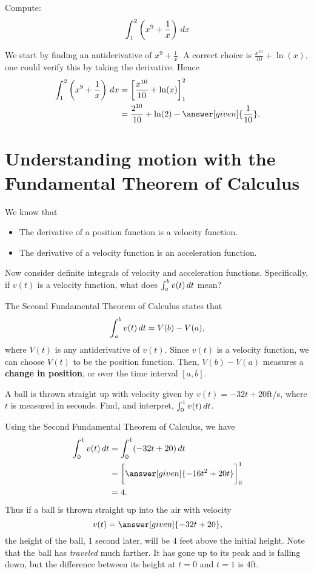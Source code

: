 \documentclass{ximera}
\begin{document}
\begin{example}
Compute:
\[
\int_1^2\left(x^9 + \frac{1}{x}\right) \,d x
\]
\begin{explanation}
We start by finding an antiderivative of $x^9 + \frac{1}{x}$.  A
correct choice is $\frac{x^{10}}{10} + \ln(x)$, one could verify this
by taking the derivative. Hence
\begin{align*}
\int_1^2\left(x^9 + \frac{1}{x}\right) \d x &= \eval{\frac{x^{10}}{10} + \ln(x)}_1^2 \\
&= \frac{2^{10}}{10} + \ln(2) - \answer[given]{\frac{1}{10}}.
\end{align*}
\end{explanation}
\end{example}




\section{Understanding motion with the Fundamental Theorem of Calculus}

We know that
\begin{itemize}
\item The derivative of a position function is a velocity function.
\item The derivative of a velocity function is an acceleration
  function.
\end{itemize}
Now consider definite integrals of velocity and acceleration
functions. Specifically, if $v(t)$ is a velocity function, what does
$\int_a^b v(t)\,d t$ mean?

The Second Fundamental Theorem of Calculus states that
\[
\int_a^b v(t)\,d t = V(b) - V(a),
\]
where $V(t)$ is any antiderivative of $v(t)$. Since $v(t)$ is a
velocity function, we can choose  $V(t)$ to be the position function. Then, $V(b) -
V(a)$ measures a \textbf{change in position}, or  over the time interval $[a,b]$.

\begin{example}
  A ball is thrown straight up with velocity given by $v(t) =
  -32t+20$ft/s, where $t$ is measured in seconds. Find, and interpret,
  $\int_0^1 v(t)\,d t$.
    \begin{explanation}
      Using the Second Fundamental Theorem of Calculus, we have
      \begin{align*}
        \int_0^1 v(t)\d t &= \int_0^1 (-32t+20)\d t \\
	&= \eval{\answer[given]{-16t^2 + 20t}}_0^1 \\
	&= 4.
      \end{align*}
      Thus if a ball is thrown straight up into the air with velocity
      \[
      v(t) = \answer[given]{-32t+20},
      \]
      the height of the ball, $1$ second later, will be $4$ feet above the
      initial height. Note that the ball has \textit{traveled} much
      farther. It has gone up to its peak and is falling down, but the
      difference between its height at $t=0$ and $t=1$ is $4$ft. 
    \end{explanation}
\end{example}    
\end{document}
